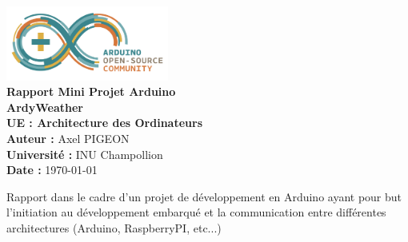 \begin{titlepage}
    \begin{center}
        \includegraphics[width=0.4\textwidth]{./images/logo_arduino.png} \\[1cm]

        {\Huge \textbf{Rapport Mini Projet Arduino}} \\[1cm]

        {\Large \textbf{ArdyWeather}} \\[2cm]

        {\textbf{UE : Architecture des Ordinateurs}} \\[2cm]

        \textbf{Auteur :} Axel PIGEON \\[0.5cm]
        \textbf{Université :} INU Champollion \\[0.5cm]
        \textbf{Date :} \today \\[2cm]

        \vfill

        {\large Rapport dans le cadre d'un projet de développement en Arduino ayant pour but 
        l'initiation au développement embarqué et la communication entre différentes architectures 
        (Arduino, RaspberryPI, etc...)}
    \end{center}
\end{titlepage}
